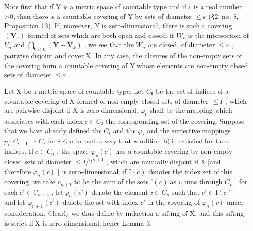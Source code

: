 Note first that if Y is a metric space of countable type and if \(\varepsilon\) is a real number \textgreater0, then there is a countable covering of Y by sets of diameter \(\leqslant\varepsilon\) (§2, no. 8, Proposition 13). If, moreover, Y is zero-dimensional, there is such a covering \((\mathbf{V}_{n})\) formed of sets which are both open and closed; if \(W_{n}\) is the intersection of \(V_{n}\) and \(\bigcap_{k<n}(\mathbf{Y}-\mathbf{V}_{k})\) , we see that the \(W_{n}\) are closed, of diameter \(\leqslant\varepsilon\) , pairwise disjoint and cover X. In any case, the closures of the non-empty sets of the covering form a countable covering of Y whose elements are non-empty closed sets of diameter \(\leqslant\varepsilon\) .

Let X be a metric space of countable type. Let \(C_{0}\) be the set of indices of a countable covering of X formed of non-empty closed sets of diameter \(\leqslant I\) , which are pairwise disjoint if X is zero-dimensional; \(\varphi_{0}\) shall be the mapping which associates with each index \(c \in C_{0}\) the corresponding set of the covering. Suppose that we have already defined the \(C_{i}\) and the \(\varphi_{i}\) and the surjective mappings \(p_{i}: C_{i+1} \to C_{i}\) for \(i \leqslant n\) in such a way that condition b) is satisfied for these indices. If \(c \in C_{n}\) , the space \(\varphi_{n}(c)\) has a countable covering by non-empty closed sets of diameter \(\leqslant I/2^{n+1}\) , which are mutually disjoint if X {[}and therefore \(\varphi_{n}(c)\) {]} is zero-dimensional; if \(\mathrm{I}(c)\) denotes the index set of this covering, we take \(c_{n+1}\) to be the sum of the sets \(\mathrm{I}(c)\) as c runs through \(C_{n}\) ; for each \(c' \in C_{n+1}\) , let \(p_{n}(c')\) denote the element \(c \in C_{n}\) such that \(c' \in \mathrm{I}(c)\) , and let \(\varphi_{n+1}(c')\) denote the set with index \(c'\) in the covering of \(\varphi_{n}(c)\) under consideration. Clearly we thus define by induction a sifting of X, and this sifting is strict if X is zero-dimensional; hence Lemma 3.

